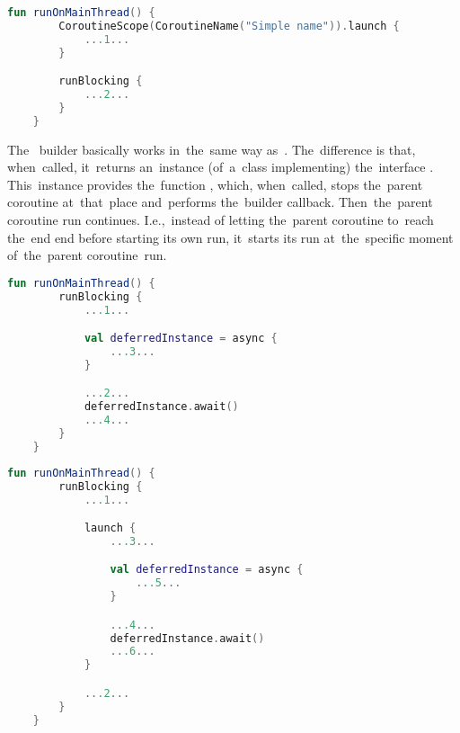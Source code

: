 \begin{lstlisting}[language=Kotlin, title={Numbers represent the~order of~execution}]
    fun runOnMainThread() {
        CoroutineScope(CoroutineName("Simple name")).launch {
            ...1...
        }

        runBlocking {
            ...2...
        }
    }
\end{lstlisting}

\label{kotlincoroutineasync}
The~ builder basically works in~the~same way as~.
The~difference is that, when~called, it~returns an~instance (of~a~class implementing) the~interface .
This~instance provides the~function , which, when~called, stops the~parent coroutine at~that~place and~performs the~builder callback.
Then~the~parent coroutine run continues.
I.e.,~instead of letting the~parent coroutine to~reach the~end end before starting its own run, it~starts its run at~the~specific moment of~the~parent coroutine~run.
\newpage

\begin{lstlisting}[language=Kotlin, title={Numbers represent the~order of~execution}]
    fun runOnMainThread() {
        runBlocking {
            ...1...

            val deferredInstance = async {
                ...3...
            }

            ...2...
            deferredInstance.await()
            ...4...
        }
    }
\end{lstlisting}

\begin{lstlisting}[language=Kotlin, title={Numbers represent the~order of~execution}]
    fun runOnMainThread() {
        runBlocking {
            ...1...

            launch {
                ...3...

                val deferredInstance = async {
                    ...5...
                }

                ...4...
                deferredInstance.await()
                ...6...
            }

            ...2...
        }
    }
\end{lstlisting}
\newpage

